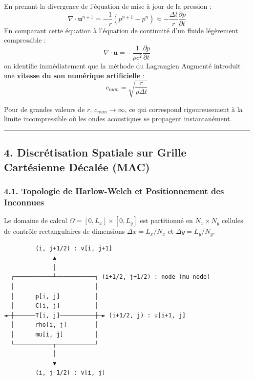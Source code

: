 \documentclass[
  french,
]{article}
\begin{document}
En prenant la divergence de l'équation de mise à jour de la pression :
\[\nabla \cdot \mathbf{u}^{n+1} = - \frac{1}{r} (p^{n+1} - p^n) \approx - \frac{\Delta t}{r} \frac{\partial p}{\partial t}\]
En comparant cette équation à l'équation de continuité d'un fluide
légèrement compressible :
\[\nabla \cdot \mathbf{u} = - \frac{1}{\rho c^2} \frac{\partial p}{\partial t}\]
on identifie immédiatement que la méthode du Lagrangien Augmenté
introduit une \textbf{vitesse du son numérique artificielle} :
\[c_{num} = \sqrt{\frac{r}{\rho \Delta t}}\]

Pour de grandes valeurs de \(r\), \(c_{num} \to \infty\), ce qui
correspond rigoureusement à la limite incompressible où les ondes
acoustiques se propagent instantanément.

\begin{center}\rule{0.5\linewidth}{0.5pt}\end{center}

\subsection{4. Discrétisation Spatiale sur Grille Cartésienne Décalée
(MAC)}\label{discruxe9tisation-spatiale-sur-grille-cartuxe9sienne-duxe9caluxe9e-mac}

\subsubsection{4.1. Topologie de Harlow-Welch et Positionnement des
Inconnues}\label{topologie-de-harlow-welch-et-positionnement-des-inconnues}

Le domaine de calcul \(\Omega = [0, L_x] \times [0, L_y]\) est
partitionné en \(N_x \times N_y\) cellules de contrôle rectangulaires de
dimensions \(\Delta x = L_x / N_x\) et \(\Delta y = L_y / N_y\).

\begin{verbatim}
         (i, j+1/2) : v[i, j+1]
              ▲
              │
  ┌───────────┴───────────┐ (i+1/2, j+1/2) : node (mu_node)
  │                       │
  │      p[i, j]          │
  │      C[i, j]          │
◄─┼──────T[i, j]──────────┼─► (i+1/2, j) : u[i+1, j]
  │      rho[i, j]        │
  │      mu[i, j]         │
  └───────────┬───────────┘
              │
              ▼
         (i, j-1/2) : v[i, j]
\end{verbatim}
\end{document}
